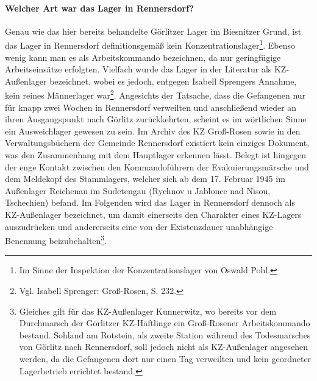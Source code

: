 \paragraph{Welcher Art war das Lager in Rennersdorf?} Genau wie das hier bereits behandelte Görlitzer Lager im Biesnitzer Grund, ist das Lager in Rennersdorf definitionsgemäß kein Konzentrationslager\footnote{Im Sinne der Inspektion der Konzentrationslager von Oswald Pohl.}. Ebenso wenig kann man es als Arbeitskommando bezeichnen, da nur geringfügige Arbeitseinsätze erfolgten. 
Vielfach wurde das Lager in der Literatur als KZ-Außenlager bezeichnet, wobei es jedoch, entgegen Isabell Sprengers Annahme, kein reines Männerlager war\footnote{Vgl. Isabell Sprenger: Groß-Rosen, S. 232.}. Angesichts der Tatsache, dass die Gefangenen nur für knapp zwei Wochen in Rennersdorf verweilten und anschließend wieder an ihren Ausgangspunkt nach Görlitz zurückkehrten, scheint es im wörtlichen Sinne ein Ausweichlager gewesen zu sein. Im Archiv des KZ Groß-Rosen sowie in den Verwaltungsbüchern der Gemeinde Rennersdorf existiert kein einziges Dokument, was den Zusammenhang mit dem Hauptlager erkennen lässt. Belegt ist hingegen der enge Kontakt zwischen den Kommandoführern der Evakuierungsmärsche und dem Meldekopf des Stammlagers, welcher sich ab dem 17. Februar 1945 im Außenlager Reichenau im Sudetengau (Rychnov u Jablonce nad Nisou, Tschechien) befand. 
Im Folgenden wird das Lager in Rennersdorf dennoch als KZ-Außenlager bezeichnet, um damit einerseits den Charakter eines KZ-Lagers auszudrücken und andererseits eine von der Existenzdauer unabhängige Benennung beizubehalten\footnote{Gleiches gilt für das KZ-Außenlager Kunnerwitz, wo bereits vor dem Durchmarsch der Görlitzer KZ-Häftlinge ein Groß-Rosener Arbeitskommando bestand. Sohland am Rotstein, als zweite Station während des Todesmarsches von Görlitz nach Rennersdorf, soll jedoch nicht als KZ-Außenlager angesehen werden, da die Gefangenen dort nur einen Tag verweilten und kein geordneter Lagerbetrieb errichtet bestand.}. 


